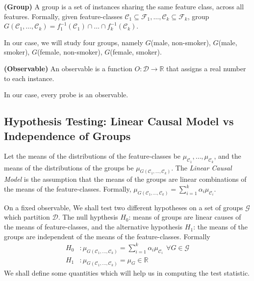 \documentclass{article}
\begin{document}
\begin{definition}
    \textbf{(Group)} A group is a set of instances sharing the same feature class, across all features. Formally, given feature-classes $\mathcal{C}_1 \subseteq{\mathcal{F}_1}, \dots, \mathcal{C}_k \subseteq \mathcal{F}_k$, group $G(\mathcal{C}_1, \dots, \mathcal{C}_k) = f_1^{-1}(\mathcal{C}_1) \cap \dots \cap f_k^{-1}(\mathcal{C}_k)$.
\end{definition}
\begin{remark}
    In our case, we will study four groups, namely $G$(male, non-smoker), $G$(male, smoker), $G$(female, non-smoker), $G$(female, smoker).
\end{remark}

\begin{definition}
    \textbf{(Observable)} An observable is a function $O: \mathcal{D} \to \mathbb{R}$ that assigns a real number to each instance.
\end{definition}
\begin{remark}
    In our case, every probe is an observable.
\end{remark}

\subsection{Hypothesis Testing: Linear Causal Model vs Independence of Groups}
Let the means of the distributions of the feature-classes be $\mu_{\mathcal{C}_1}, \dots, \mu_{\mathcal{C}_k}$, and the means of the distributions of the groups be $\mu_{G(\mathcal{C}_1, \dots, \mathcal{C}_k)}$. The \textit{Linear Causal Model} is the assumption that the means of the groups are linear combinations of the means of the feature-classes. Formally, $\mu_{G(\mathcal{C}_1, \dots, \mathcal{C}_k)} = \sum_{i=1}^k \alpha_i \mu_{\mathcal{C}_i}$.

On a fixed observable, We shall test two different hypotheses on a set of groups $\mathcal{G}$ which partition $\mathcal{D}$. The null hypthesis $H_0$: means of groups are linear causes of the means of feature-classes, and the alternative hypothesis $H_1$: the means of the groups are independent of the means of the feature-classes. Formally
\begin{align*}
    H_0 & : \mu_{G(\mathcal{C}_1, \dots, \mathcal{C}_k)} = \sum_{i=1}^k \alpha_i \mu_{\mathcal{C}_i} \ \ \forall G \in \mathcal{G} \\
    H_1 & : \mu_{G(\mathcal{C}_1, \dots, \mathcal{C}_k)} = \mu_G \in \mathbb{R}
\end{align*}
We shall define some quantities which will help us in computing the test statistic.
\end{document}
